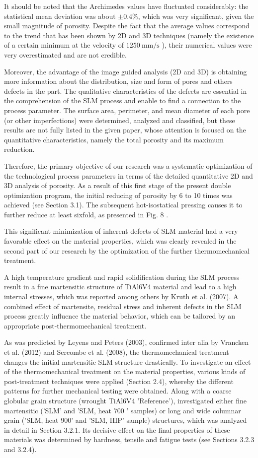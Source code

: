 \documentclass[10pt]{article}
\begin{document}
It should be noted that the Archimedes values have fluctuated considerably: the statistical mean deviation was about $\pm 0.4 \%$, which was very significant, given the small magnitude of porosity. Despite the fact that the average values correspond to the trend that has been shown by 2D and 3D techniques (namely the existence of a certain minimum at the velocity of $1250 \mathrm{~mm} / \mathrm{s}$ ), their numerical values were very overestimated and are not credible.

Moreover, the advantage of the image guided analysis (2D and 3D) is obtaining more information about the distribution, size and form of pores and others defects in the part. The qualitative characteristics of the defects are essential in the comprehension of the SLM process and enable to find a connection to the process parameter. The surface area, perimeter, and mean diameter of each pore (or other imperfections) were determined, analyzed and classified, but these results are not fully listed in the given paper, whose attention is focused on the quantitative characteristics, namely the total porosity and its maximum reduction.

Therefore, the primary objective of our research was a systematic optimization of the technological process parameters in terms of the detailed quantitative 2D and 3D analysis of porosity. As a result of this first stage of the present double optimization program, the initial reducing of porosity by 6 to 10 times was achieved (see Section 3.1). The subsequent hot-isostatical pressing causes it to further reduce at least sixfold, as presented in Fig. 8 .

This significant minimization of inherent defects of SLM material had a very favorable effect on the material properties, which was clearly revealed in the second part of our research by the optimization of the further thermomechanical treatment.

A high temperature gradient and rapid solidification during the SLM process result in a fine martensitic structure of TiAl6V4 material and lead to a high internal stresses, which was reported among others by Kruth et al. (2007). A combined effect of martensite, residual stress and inherent defects in the SLM process greatly influence the material behavior, which can be tailored by an appropriate post-thermomechanical treatment.

As was predicted by Leyens and Peters (2003), confirmed inter alia by Vrancken et al. (2012) and Sercombe et al. (2008), the thermomechanical treatment changes the initial martensitic SLM structure drastically. To investigate an effect of the thermomechanical treatment on the material properties, various kinds of post-treatment techniques were applied (Section 2.4), whereby the different patterns for further mechanical testing were obtained. Along with a coarse globular grain structure (wrought TiAl6V4 'Reference'), investigated either fine martensitic ('SLM' and 'SLM, heat 700 ' samples) or long and wide columnar grain ('SLM, heat 900' and 'SLM, HIP' sample) structures, which was analyzed in detail in Section 3.2.1. Its decisive effect on the final properties of these materials was determined by hardness, tensile and fatigue tests (see Sections 3.2.3 and 3.2.4).
\end{document}
